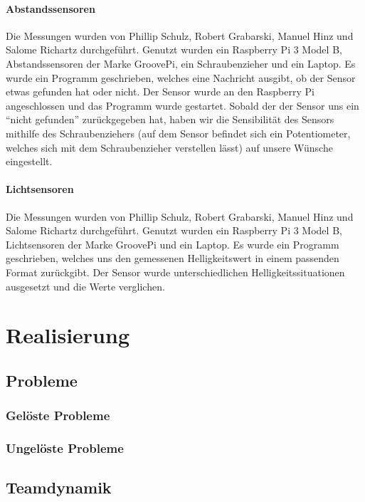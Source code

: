 \documentclass{report}
\begin{document}
\subsubsection{Abstandssensoren}

Die Messungen wurden von Phillip Schulz, Robert Grabarski, Manuel Hinz und Salome Richartz durchgef\"{u}hrt. Genutzt wurden ein Raspberry Pi 3 Model B, Abstandssensoren der Marke GroovePi, ein Schraubenzieher und ein Laptop. Es wurde ein Programm geschrieben, welches eine Nachricht ausgibt, ob der Sensor etwas gefunden hat oder nicht. Der Sensor wurde an den Raspberry Pi angeschlossen und das Programm wurde gestartet. Sobald der der Sensor uns ein “nicht gefunden” zur\"{u}ckgegeben hat, haben wir die Sensibilit\"{a}t des Sensors mithilfe des Schraubenziehers (auf dem Sensor befindet sich ein Potentiometer, welches sich mit dem Schraubenzieher verstellen l\"{a}sst) auf unsere W\"{u}nsche eingestellt.

\subsubsection{Lichtsensoren}

Die Messungen wurden von Phillip Schulz, Robert Grabarski, Manuel Hinz und Salome Richartz durchgef\"{u}hrt. Genutzt wurden ein Raspberry Pi 3 Model B, Lichtsensoren der Marke GroovePi und ein Laptop. Es wurde ein Programm geschrieben, welches uns den gemessenen Helligkeitswert in einem passenden Format zur\"{u}ckgibt. Der Sensor wurde unterschiedlichen Helligkeitssituationen ausgesetzt und die Werte verglichen.


\chapter{Realisierung}

\section{Probleme}

\subsection{Gel\"{o}ste Probleme}

\subsection{Ungel\"{o}ste Probleme}

\section{Teamdynamik}
\end{document}
